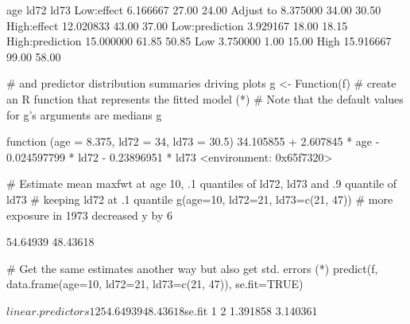 \begin{Schunk}
\begin{Soutput}
                      age  ld72  ld73
Low:effect       6.166667 27.00 24.00
Adjust to        8.375000 34.00 30.50
High:effect     12.020833 43.00 37.00
Low:prediction   3.929167 18.00 18.15
High:prediction 15.000000 61.85 50.85
Low              3.750000  1.00 15.00
High            15.916667 99.00 58.00
\end{Soutput}
\begin{Sinput}
                      # and predictor distribution summaries driving plots
g <- Function(f)  # create an R function that represents the fitted model (*\ipacue*)
# Note that the default values for g's arguments are medians
g
\end{Sinput}
\begin{Soutput}
function (age = 8.375, ld72 = 34, ld73 = 30.5) 
{
    34.105855 + 2.607845 * age - 0.024597799 * ld72 - 0.23896951 * 
        ld73
}
<environment: 0x65f7320>
\end{Soutput}
\begin{Sinput}
# Estimate mean maxfwt at age 10, .1 quantiles of ld72, ld73 and .9 quantile of ld73
# keeping ld72 at .1 quantile
g(age=10, ld72=21, ld73=c(21, 47))  # more exposure in 1973 decreased y by 6
\end{Sinput}
\begin{Soutput}
[1] 54.64939 48.43618
\end{Soutput}
\begin{Sinput}
# Get the same estimates another way but also get std. errors (*\ipacue*)
predict(f, data.frame(age=10, ld72=21, ld73=c(21, 47)), se.fit=TRUE)
\end{Sinput}
\begin{Soutput}
$linear.predictors
       1        2 
54.64939 48.43618 

$se.fit
       1        2 
1.391858 3.140361 
\end{Soutput}
\end{Schunk}

